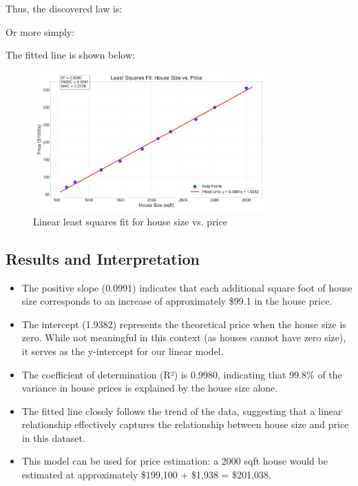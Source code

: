 \documentclass[12pt]{article}
\begin{document}
Thus, the discovered law is:

\begin{center}
\end{center}

Or more simply:

\begin{center}
\end{center}

The fitted line is shown below:

\begin{figure}[H]
\centering
\includegraphics[width=0.8\textwidth]{fitted_line.png}
\caption{Linear least squares fit for house size vs. price}
\label{fig:fitted_line}
\end{figure}

\subsection{Results and Interpretation}

\begin{itemize}
    \item The positive slope (0.0991) indicates that each additional square foot of house size corresponds to an increase of approximately \$99.1 in the house price.
    \item The intercept (1.9382) represents the theoretical price when the house size is zero. While not meaningful in this context (as houses cannot have zero size), it serves as the y-intercept for our linear model.
    \item The coefficient of determination (R²) is 0.9980, indicating that 99.8\% of the variance in house prices is explained by the house size alone.
    \item The fitted line closely follows the trend of the data, suggesting that a linear relationship effectively captures the relationship between house size and price in this dataset.
    \item This model can be used for price estimation: a 2000 sqft house would be estimated at approximately \$199,100 + \$1,938 = \$201,038.
\end{itemize}
\end{document}
